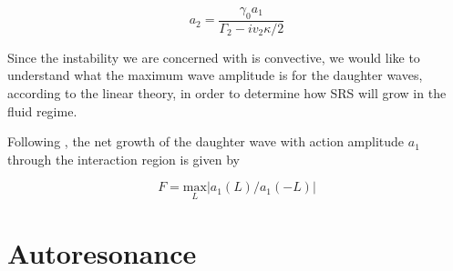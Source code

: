 \begin{equation}
	a_2 = \frac{\gamma_0a_1}{\Gamma_2 - i v_2 \kappa/2}
\end{equation}



Since the instability we are concerned with is convective, we would like to understand what the maximum wave amplitude is for the daughter waves, according to the linear theory, in order to determine how SRS will grow in the fluid regime.

Following \cite{Williams1991}, the net growth of the daughter wave with action amplitude $a_1$ through the interaction region is given by 

\begin{equation}
 F = \underset{L}{\text{max}} |a_1(L)/a_1(-L)|
\end{equation}

\section{Autoresonance}

%
%
